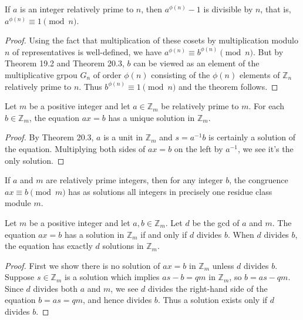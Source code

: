 \documentclass[a4paper,11pt]{article}
\begin{document}
\begin{outline}
    If \(a\) is an integer relatively prime to \(n\), then \(a^{\phi(n)} - 1\) is divisible by \(n\), 
    that is, \(a^{\phi(n)} \equiv 1 \pmod{n}\).
    
    \begin{proof}
      Using the fact that multiplication of these cosets by multiplication modulo \(n\) of representatives is well-defined,
      we have \(a^{\phi(n)} \equiv b^{\phi(n)} \pmod{n}\). But by Theorem 19.2 and Theorem 20.3, \(b\) can be viewed as an
      element of the multiplicative grpou \(G_n\) of order \(\phi(n)\) consisting of the \(\phi(n)\) elements of 
      \(\mathbb{Z}_n\) relatively prime to \(n\). Thus \(b^{\phi(n)} \equiv 1 \pmod{n}\) and the theorem follows.
    \end{proof}
      
    Let \(m\) be a positive integer and let \(a \in \mathbb{Z}_m\) be relatively prime to \(m\).
    For each \(b \in \mathbb{Z}_m\), the equation \(ax = b\) has a unique solution in \(\mathbb{Z}_m\).
    
    \begin{proof}
      By Theorem 20.3, \(a\) is a unit in \(\mathbb{Z}_m\) and \(s = a^{-1}b\) is certainly a solution of the equation.
      Multiplying both sides of \(ax = b\) on the left by \(a^{-1}\), we see it's the only solution.
    \end{proof}
      
    If \(a\) and \(m\) are relatively prime integers, then for any integer \(b\), the congruence
    \(ax \equiv b \pmod{m}\) has as solutions all integers in precisely one residue class module \(m\).
      
    Let \(m\) be a positive integer and let \(a, b \in \mathbb{Z}_m\). Let \(d\) be the gcd of
    \(a\) and \(m\). The equation \(ax = b\) has a solution in \(\mathbb{Z}_m\) if and only if \(d\) 
    divides \(b\). When \(d\) divides \(b\), the equation has exactly \(d\) solutions in \(\mathbb{Z}_m\).
    
    \begin{proof}
      First we show there is no solution of \(ax = b\) in \(\mathbb{Z}_m\) unless \(d\) divides \(b\). Suppose
      \(s \in \mathbb{Z}_m\) is a solution which implies \(as - b = qm\) in \(\mathbb{Z}_m\), so \(b = as - qm\).
      Since \(d\) divides both \(a\) and \(m\), we see \(d\) divides the right-hand side of the equation 
      \(b = as = qm\), and hence divides \(b\). Thus a solution exists only if \(d\) divides \(b\).
      

\end{proof}
\end{outline}
\end{document}
